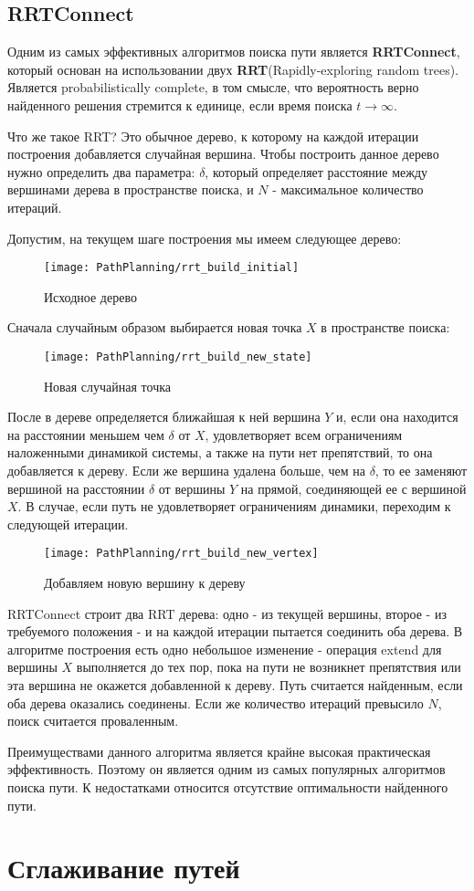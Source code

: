 \subsection{RRTConnect} \label{subsect1_2_3}
Одним из самых эффективных алгоритмов поиска пути является \textbf{RRTConnect}, который основан на использовании двух \textbf{RRT}(Rapidly-exploring random trees)\cite{RRTWiki}. Является probabilistically complete, в том смысле, что вероятность верно найденного решения стремится к единице, если время поиска $t \rightarrow \infty$.

Что же такое RRT? Это обычное дерево, к которому на каждой итерации построения добавляется случайная вершина. Чтобы построить данное дерево нужно определить два параметра: $\delta$, который определяет расстояние между вершинами дерева в пространстве поиска, и $N$ - максимальное количество итераций.

Допустим, на текущем шаге построения мы имеем следующее дерево:
\begin{figure}[ht]
    \centering
    \texttt{[image: PathPlanning/rrt\_build\_initial]}
    \caption{Исходное дерево}
\end{figure}

Сначала случайным образом выбирается новая точка $X$ в пространстве поиска:
\begin{figure}[ht]
    \centering
    \texttt{[image: PathPlanning/rrt\_build\_new\_state]}
    \caption{Новая случайная точка}
\end{figure}

После в дереве определяется ближайшая к ней вершина $Y$ и, если она находится на расстоянии меньшем чем $\delta$ от $X$, удовлетворяет всем ограничениям наложенными динамикой системы, а также на пути нет препятствий, то она добавляется к дереву. Если же вершина удалена больше, чем на $\delta$, то ее заменяют вершиной на расстоянии $\delta$ от вершины $Y$ на прямой, соединяющей ее с вершиной $X$. В случае, если путь не удовлетворяет ограничениям динамики, переходим к следующей итерации.
\begin{figure}[ht]
    \centering
    \texttt{[image: PathPlanning/rrt\_build\_new\_vertex]}
    \caption{Добавляем новую вершину к дереву}
\end{figure}

RRTConnect строит два RRT дерева: одно - из текущей вершины, второе - из требуемого положения - и на каждой итерации пытается соединить оба дерева. В алгоритме построения есть одно небольшое изменение - операция extend для вершины $X$ выполняется до тех пор, пока на пути не возникнет препятствия или эта вершина не окажется добавленной к дереву. Путь считается найденным, если оба дерева оказались соединены. Если же количество итераций превысило $N$, поиск считается проваленным.\cite{RRTConnect}

Преимуществами данного алгоритма является крайне высокая практическая эффективность.\cite{RRTConnect} Поэтому он является одним из самых популярных алгоритмов поиска пути. К недостатками относится отсутствие оптимальности найденного пути.

\section{Сглаживание путей}\label{sect1_3}
